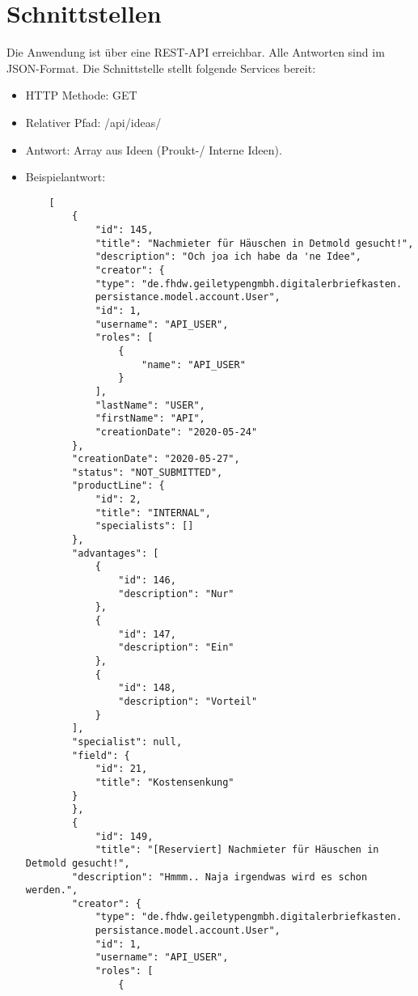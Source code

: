 \usepackage{cleveref}



\section{Schnittstellen}

Die Anwendung ist über eine REST-API erreichbar. Alle Antworten sind im JSON-Format. Die Schnittstelle stellt folgende Services bereit:
\begin{itemize}
    \item HTTP Methode: GET
    \item Relativer Pfad: /api/ideas/
    \item Antwort: Array aus Ideen (Proukt-/ Interne Ideen).
    \item Beispielantwort:
    \begin{verbatim}
    [
        {
            "id": 145,
            "title": "Nachmieter für Häuschen in Detmold gesucht!",
            "description": "Och joa ich habe da 'ne Idee",
            "creator": {
            "type": "de.fhdw.geiletypengmbh.digitalerbriefkasten.
            persistance.model.account.User",
            "id": 1,
            "username": "API_USER",
            "roles": [
                {
                    "name": "API_USER"
                }
            ],
            "lastName": "USER",
            "firstName": "API",
            "creationDate": "2020-05-24"
        },
        "creationDate": "2020-05-27",
        "status": "NOT_SUBMITTED",
        "productLine": {
            "id": 2,
            "title": "INTERNAL",
            "specialists": []
        },
        "advantages": [
            {
                "id": 146,
                "description": "Nur"
            },
            {
                "id": 147,
                "description": "Ein"
            },
            {
                "id": 148,
                "description": "Vorteil"
            }
        ],
        "specialist": null,
        "field": {
            "id": 21,
            "title": "Kostensenkung"
        }
        },
        {
            "id": 149,
            "title": "[Reserviert] Nachmieter für Häuschen in Detmold gesucht!",
        "description": "Hmmm.. Naja irgendwas wird es schon werden.",
        "creator": {
            "type": "de.fhdw.geiletypengmbh.digitalerbriefkasten.
            persistance.model.account.User",
            "id": 1,
            "username": "API_USER",
            "roles": [
                {

\end{verbatim}
\end{itemize}
